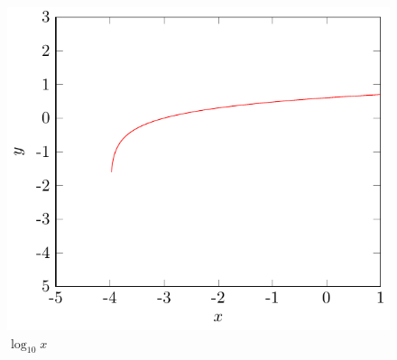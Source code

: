 \documentclass{report}
\begin{document}
\begin{figure}
	\centering
	\caption{$\log_{10}x$}
	\label{fig:log_10(x)}
	\includegraphics[scale=0.25]{log_(10)x}
\end{figure}
\end{document}
